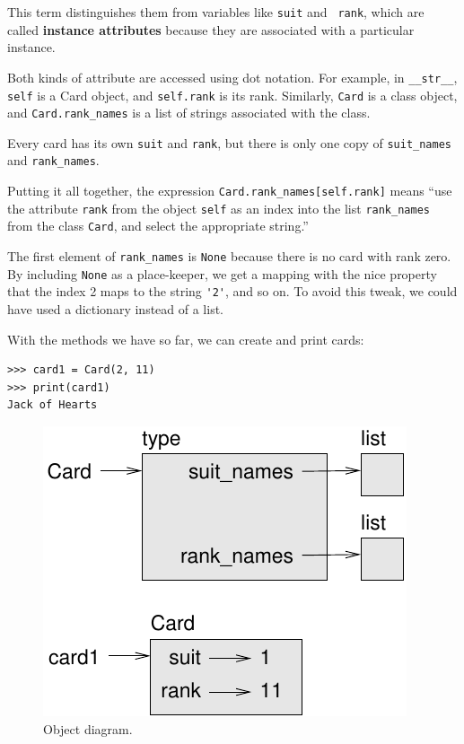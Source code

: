 \documentclass[10pt]{book}
\begin{document}
This term distinguishes them from variables like {\tt suit} and {\tt
  rank}, which are called {\bf instance attributes} because they are
associated with a particular instance.

Both kinds of attribute are accessed using dot notation.  For
example, in \verb"__str__", {\tt self} is a Card object,
and {\tt self.rank} is its rank.  Similarly, {\tt Card}
is a class object, and \verb"Card.rank_names" is a
list of strings associated with the class.

Every card has its own {\tt suit} and {\tt rank}, but there
is only one copy of \verb"suit_names" and \verb"rank_names".

Putting it all together, the expression
\verb"Card.rank_names[self.rank]" means ``use the attribute {\tt rank}
from the object {\tt self} as an index into the list \verb"rank_names"
from the class {\tt Card}, and select the appropriate string.''

The first element of \verb"rank_names" is {\tt None} because there
is no card with rank zero.  By including {\tt None} as a place-keeper,
we get a mapping with the nice property that the index 2 maps to the
string \verb"'2'", and so on.  To avoid this tweak, we could have
used a dictionary instead of a list.

With the methods we have so far, we can create and print cards:

\begin{verbatim}
>>> card1 = Card(2, 11)
>>> print(card1)
Jack of Hearts
\end{verbatim}

\begin{figure}
\centerline
{\includegraphics[scale=0.8]{figs/card1.pdf}}
\caption{Object diagram.}
\label{fig.card1}
\end{figure}
\end{document}
